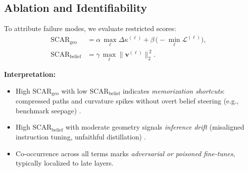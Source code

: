 \documentclass[11pt]{article}
\begin{document}
\vspace{0.6em}
\subsection{Ablation and Identifiability}
\label{subsec:scar-ablation}
To attribute failure modes, we evaluate restricted scores:
\[
\begin{aligned}
\mathrm{SCAR}_{\mathrm{geo}}
  &= \alpha\,\max_{\ell} \Delta\kappa^{(\ell)}
     + \beta\,\big(-\min_{\ell}\mathcal{L}^{(\ell)}\big),\\
\mathrm{SCAR}_{\mathrm{belief}}
  &= \gamma\,\max_{\ell} \|\mathbf{v}^{(\ell)}\|_2^{\,2}.
\end{aligned}
\]

\textbf{Interpretation:}
\begin{itemize}\setlength\itemsep{2pt}
\item High $\mathrm{SCAR}_{\mathrm{geo}}$ with low $\mathrm{SCAR}_{\mathrm{belief}}$ indicates \emph{memorization shortcuts}: compressed paths and curvature spikes without overt belief steering (e.g., benchmark seepage) \citep{geirhos2020shortcut,dodge2021documenting}.
\item High $\mathrm{SCAR}_{\mathrm{belief}}$ with moderate geometry signals \emph{inference drift} (misaligned instruction tuning, unfaithful distillation) \citep{ouyang2022instructgpt,bai2022harmless,rafailov2023dpo}.
\item Co-occurrence across all terms marks \emph{adversarial or poisoned fine-tunes}, typically localized to late layers.
\end{itemize}

\vspace{0.6em}
\end{document}
